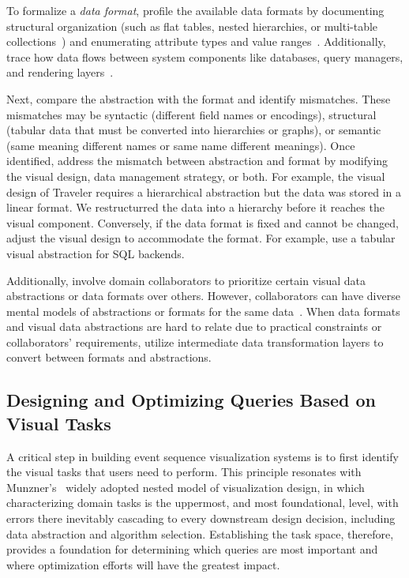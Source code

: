 \begin{refsection}
To formalize a \textit{data format}, profile the available data formats by documenting structural organization (such as flat tables, nested hierarchies, or multi-table collections~\cite{kasica2020table}) and enumerating attribute types and value ranges~\cite{kandel2011research}. Additionally, trace how data flows between system components like databases, query managers, and rendering layers~\cite{battle2020structured, yang2024optimizing}.

Next, compare the abstraction with the format and identify mismatches. These mismatches may be syntactic (different field names or encodings), structural (tabular data that must be converted into hierarchies or graphs), or semantic (same meaning different names or same name different meanings). Once identified, address the mismatch between abstraction and format by modifying the visual design, data management strategy, or both. For example, the visual design of Traveler requires a hierarchical abstraction but the data was stored in a linear format. We restructurred the data into a hierarchy before it reaches the visual component. Conversely, if the data format is fixed and cannot be changed, adjust the visual design to accommodate the format. For example, use a tabular visual abstraction for SQL backends.

Additionally, involve domain collaborators to prioritize certain visual data abstractions or data formats over others. However, collaborators can have diverse mental models of abstractions or formats for the same data~\cite{williams2023data, bigelow2020guidelines}. When data formats and visual data abstractions are hard to relate due to practical constraints or collaborators' requirements, utilize intermediate data transformation layers to convert between formats and abstractions. 

\subsection{Designing and Optimizing Queries Based on Visual Tasks}
\label{subsec:query_tasks}

A critical step in building event sequence visualization systems is to first identify the visual tasks that users need to perform. This principle resonates with Munzner's~\cite{munzner2009nested} widely adopted nested model of visualization design, in which characterizing domain tasks is the uppermost, and most foundational, level, with errors there inevitably cascading to every downstream design decision, including data abstraction and algorithm selection. Establishing the task space, therefore, provides a foundation for determining which queries are most important and where optimization efforts will have the greatest impact.


\end{refsection}
